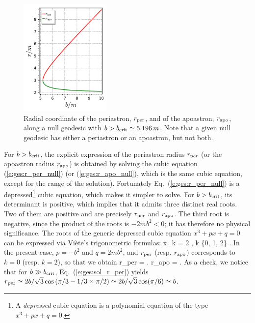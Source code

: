 \begin{figure}
\centerline{\includegraphics[width=0.4\textwidth]{ges_null_per_apo.pdf}}
\caption[]{\label{f:ges:null_per_apo} \footnotesize
Radial coordinate of the periastron, $r_{\rm per}$, and of the apoastron,
$r_{\rm apo}$, along a null geodesic with $b > b_{\rm crit} \simeq 5.196\, m$.
Note that a given null geodesic has either a periastron or an apoastron, but not
both.}
\end{figure}


For $b > b_{\rm crit}$, the explicit expression of the periastron radius
$r_{\rm per}$ (or the apoastron radius $r_{\rm apo}$)
is obtained by solving the cubic equation (\ref{e:ges:r_per_null})
(or (\ref{e:ges:r_apo_null}), which is the same cubic equation, except for
the range of the solution). Fortunately Eq.~(\ref{e:ges:r_per_null})
is a depressed\footnote{A \emph{depressed} cubic equation is a polynomial equation
of the type $x^3 + p x + q = 0$.} cubic equation, which makes
it simpler to solve. For $b > b_{\rm crit}$, its determinant is positive, which
implies that it admits three distinct real roots. Two of them are positive
and are precisely $r_{\rm per}$ and $r_{\rm apo}$. The third root is negative,
since the product of the roots is $-2mb^2 < 0$; it has therefore no
physical significance. The roots of the generic depressed cubic
equation $x^3 + p x + q = 0$ can be expressed via Viète's
trigonometric formulas:
\be
    x_k = 2  \cos {},
        \qquad k \in \{0, 1, 2\} .
\ee
In the present case, $p= - b^2$ and $q = 2 m b^2$,
and $r_{\rm per}$ (resp. $r_{\rm apo}$) corresponds to $k=0$
(resp. $k=2$), so that we obtain
\be \label{e:ges:sol_r_per}
    r_{\rm per} =  \cos{} .
\ee
\be
    r_{\rm apo} =  \cos{} .
\ee
As a check, we notice that for $b\gg b_{\rm crit}$, Eq.~(\ref{e:ges:sol_r_per})
yields $r_{\rm per} \simeq 2b/\sqrt{3} \cos\left(\pi/3 -1/3 \times \pi/2 \right)
\simeq 2b/\sqrt{3} \cos(\pi/6) \simeq b$.

